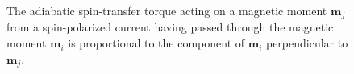 \begin{figure}[h!]
\centering
{}
        \caption{The adiabatic spin-transfer torque acting on a magnetic moment $\mathbold{m}_j$ from a spin-polarized current having passed through the magnetic moment $\mathbold{m}_i$ is proportional to the component of $\mathbold{m}_i$ perpendicular to $\mathbold{m}_j$.}
        \label{fig:AdSTT}
\end{figure}

